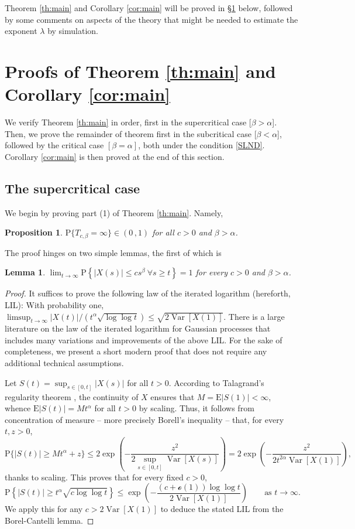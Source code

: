 \documentclass[reqno]{amsart}
\DeclareMathOperator{\Var}{Var}
\newcommand{\<}{\langle}
\renewcommand{\>}{\rangle}
\renewcommand{\P}{\mathrm{P}}
\newcommand{\E}{\mathrm{E}}
\newcommand{\1}{\mathbb{1}}
\renewcommand{\ge}{\geqslant}
\renewcommand{\le}{\leqslant}
\newtheorem{proposition}[stat]{Proposition}
\newtheorem{lemma}[stat]{Lemma}
\theoremstyle{definition}
\numberwithin{equation}{section}
\begin{document}
Theorem \ref{th:main} and Corollary \ref{cor:main}
will be proved in \S\ref{proof} below, followed by some comments
on aspects of the theory that might be needed to estimate 
the exponent $\lambda$ by simulation.


\section{Proofs of Theorem \ref{th:main} and Corollary \ref{cor:main}}\label{proof}

We verify Theorem \ref{th:main} in order,
first in the supercritical case [$\beta>\alpha$]. Then, we
prove the remainder of theorem first
in the subcritical case [$\beta<\alpha$], followed by
the critical case $[\beta=\alpha]$, both under
the condition \eqref{SLND}. Corollary \ref{cor:main}
is then proved at the end of this section.

\subsection{The supercritical case} 

We begin by proving part (1) of Theorem \ref{th:main}. Namely, 
\begin{proposition}\label{pr:supercritical}
	$\P\{T_{c,\beta}=\infty\}\in(0\,,1)$ for all $c>0$ and $\beta>\alpha$.
\end{proposition}

The proof hinges on two simple lemmas, the first of which is

\begin{lemma}\label{lem:LIL}
	$\lim_{t\to\infty}\P\left\{ |X(s)| \le  cs^\beta \ \forall s\ge t\right\}=1$
	for every $c>0$ and $\beta>\alpha$.
\end{lemma}


\begin{proof}
	It suffices to prove the following law of the iterated logarithm (hereforth, LIL): With probability one,
	$\limsup_{t\to\infty} |X(t)|/(t^\alpha\sqrt{\log\log t})\le \sqrt{2\Var[X(1)]}.$
	There is a large literature on the law of the iterated logarithm for
	Gaussian processes that includes many variations and improvements
	of the above LIL. For the sake of completeness,
	we present a short modern proof that 
	does not require any additional technical assumptions.

	Let $S(t) = \sup_{s\in[0,t]}|X(s)|$ for all $t>0$.
	According to Talagrand's regularity theorem \cite{Talagrand}, the continuity of $X$
	ensures that $M=\E|S(1)|<\infty$, whence
	$\E|S(t)|=Mt^\alpha$ for all $t>0$ by scaling.
	Thus, it follows from concentration of measure -- more precisely
	Borell's inequality \cite{Borell} -- that, for every
	$t,z>0$,
	\[
		\P\{ |S(t)| \ge Mt^\alpha +z\}
		\le2\exp\left( -\frac{z^2}{2\sup_{s\in[0,t]}\Var[X(s)]}\right)
		= 2\exp\left( -\frac{z^2}{2t^{2\alpha}\Var[X(1)]}\right),
	\]
	thanks to scaling. This proves that for every fixed $c>0$,
	\[
		\P\left\{ |S(t)| \ge t^\alpha\sqrt{c\log\log t}\right\}
		\le\exp\left( - \frac{(c+ \mathcal{o}(1))\log\log t}{2\Var[X(1)]}\right)\qquad
		\text{as $t\to\infty$}.
	\]
	We apply this for any $c>2\Var[X(1)]$ to deduce
	the stated LIL from the Borel-Cantelli lemma.
\end{proof}
\end{document}
